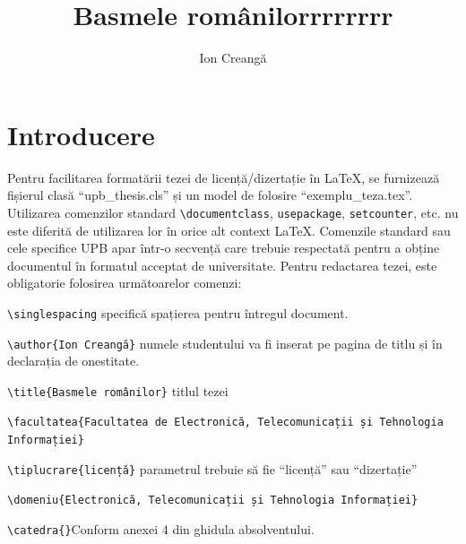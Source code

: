 \documentclass[12pt, a4paper, oneside, romanian]{teza-upb}
\begin{document}
\author{Ion Creangă}

\title{Basmele românilorrrrrrrr}




\beforepreface
\listoffigures
\listoftables
{}
\afterpreface 

\chapter{Introducere}


   Pentru facilitarea formatării tezei de licență/dizertație în
   \LaTeX{}, se furnizează fișierul clasă ``upb\_thesis.cls'' și un model de
   folosire ``exemplu\_teza.tex''.  Utilizarea comenzilor standard
   \verb=\documentclass=, \verb=usepackage=, \verb=setcounter=,
   etc. nu este diferită de utilizarea lor în orice alt context
   \LaTeX{}. Comenzile standard sau cele specifice {UPB}
   apar într-o secvență care trebuie respectată pentru a obține documentul în formatul
   acceptat de universitate.  Pentru redactarea tezei, este
   obligatorie folosirea următoarelor comenzi:

\verb=\singlespacing= specifică spațierea pentru întregul document.

\verb=\author{Ion Creangă}= numele studentului va fi inserat pe pagina de titlu și în declarația de onestitate.  

\verb=\title{Basmele românilor}= titlul tezei 

\verb=\facultatea{Facultatea de Electronică, Telecomunicații și Tehnologia= \\
\verb=Informației}=

\verb=\tiplucrare{licență}= parametrul trebuie să fie ``licență'' sau ``dizertație''

\verb=\domeniu{Electronică, Telecomunicații și Tehnologia Informației}=

\verb=\catedra{}=Conform anexei 4 din ghidula absolventului. 
\end{document}
